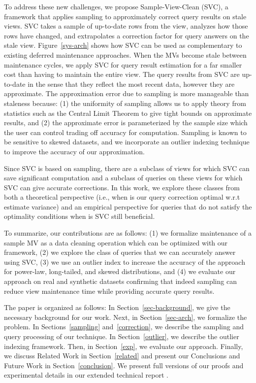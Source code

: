 To address these new challenges, we propose Sample-View-Clean (SVC), a framework that applies sampling to approximately correct query results on stale views.
SVC takes a sample of up-to-date rows from the view, analyzes how those rows have changed, and extrapolates a correction factor for query answers on the stale view. Figure~\ref{sys-arch} shows how SVC can be used as complementary to existing deferred maintenance approaches. When the MVs become stale between maintenance cycles, we apply SVC for query result estimation for a far smaller cost than having to maintain the entire view.
The query results from SVC are up-to-date in the sense that they reflect the most recent data, however they are approximate. 
The approximation error due to sampling is more manageable than staleness because: (1) the uniformity of sampling allows us to apply theory from statistics such as the Central Limit Theorem to give tight bounds on approximate results, and (2) the approximate error is parameterized by the sample size which the user can control trading off accuracy for computation.
Sampling is known to be sensitive to skewed datasets, and we incorporate an outlier indexing technique to improve the accuracy of our approximation.

Since SVC is based on sampling, there are a subclass of views for which SVC can save significant computation and a subclass of queries on these views for which SVC can give accurate corrections.
In this work, we explore these classes from both a theoretical perspective (i.e., when is our query correction optimal w.r.t estimate variance) and an empirical perspective for queries that do not satisfy the optimality conditions when is SVC still beneficial.

To summarize, our contributions are as follows: (1) we formalize maintenance of a sample MV as a data cleaning operation which can be optimized with our framework, (2) we explore the class of queries that we can accurately answer using SVC, (3) we use an outlier index to increase the accuracy of the approach for power-law, long-tailed, and skewed distributions, and (4) we evaluate our approach on real and synthetic datasets confirming that indeed sampling can reduce view maintenance time while providing accurate query results. 

The paper is organized as follows: 
In Section~\ref{sec-background}, we give the necessary background for our work.
Next, in Section~\ref{sec-arch}, we formalize the problem.
In Sections~\ref{sampling} and~\ref{correction}, we describe the sampling and query processing of our technique.
In Section~\ref{outlier}, we describe the outlier indexing framework.
Then, in Section~\ref{exp}, we evaluate our approach.
Finally, we discuss Related Work in Section~\ref{related} and present our Conclusions and Future Work in Section~\ref{conclusion}.
We present full versions of our proofs and experimental details in our extended technical report \cite{technicalReport}.

